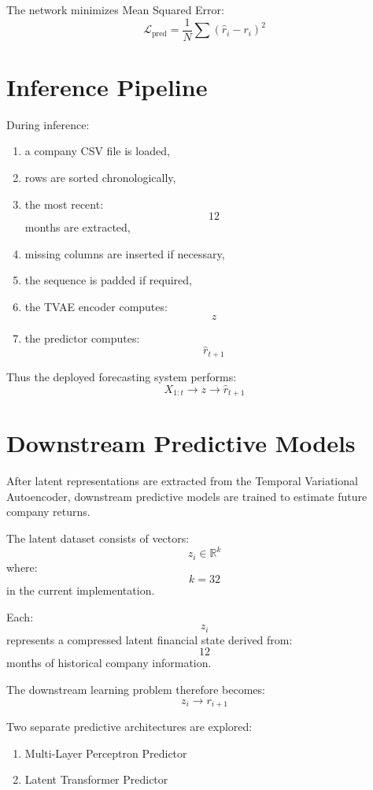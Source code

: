\documentclass[11pt]{article}
\begin{document}
The network minimizes Mean Squared Error:
\[
\mathcal{L}_{\text{pred}}
=
\frac1N
\sum
(\hat r_i-r_i)^2
\]

\section{Inference Pipeline}

During inference:
\begin{enumerate}
    \item a company CSV file is loaded,
    \item rows are sorted chronologically,
    \item the most recent:
    \[
    12
    \]
    months are extracted,
    \item missing columns are inserted if necessary,
    \item the sequence is padded if required,
    \item the TVAE encoder computes:
    \[
    z
    \]
    \item the predictor computes:
    \[
    \hat r_{t+1}
    \]
\end{enumerate}

Thus the deployed forecasting system performs:
\[
X_{1:t}
\rightarrow
z
\rightarrow
\hat r_{t+1}
\]

\section{Downstream Predictive Models}

After latent representations are extracted from the Temporal Variational Autoencoder, downstream predictive models are trained to estimate future company returns.

The latent dataset consists of vectors:
\[
z_i \in \mathbb{R}^k
\]
where:
\[
k = 32
\]
in the current implementation.

Each:
\[
z_i
\]
represents a compressed latent financial state derived from:
\[
12
\]
months of historical company information.

The downstream learning problem therefore becomes:
\[
z_i
\rightarrow
r_{i+1}
\]

Two separate predictive architectures are explored:
\begin{enumerate}
    \item Multi-Layer Perceptron Predictor
    \item Latent Transformer Predictor
\end{enumerate}
\end{document}
